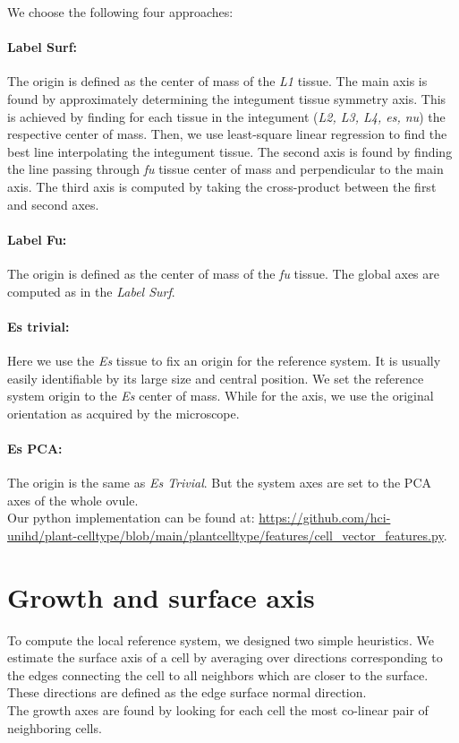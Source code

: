 \documentclass[10pt,twocolumn,letterpaper]{article}
\begin{document}
We choose the following four approaches: 

\paragraph{Label Surf:} The origin is defined as the center of mass of the \textit{L1} tissue. 
The main axis is found by approximately determining the integument tissue symmetry axis. This is achieved by finding for each tissue in the integument (\textit{L2, L3, L4, es, nu}) the respective center of mass. Then, we use least-square linear regression to find the best line interpolating the integument tissue. The second axis is found by finding the line passing through \textit{fu} tissue center of mass and perpendicular to the main axis. The third axis is computed by taking the cross-product between the first and second axes.

\paragraph{Label Fu:} The origin is defined as the center of mass of the \textit{fu} tissue. The global axes are computed as in the \textit{Label Surf}.

\paragraph{Es trivial:} Here we use the \textit{Es} tissue to fix an origin for the reference system. It is usually easily identifiable by its large size and central position. We set the reference system origin to the  \textit{Es} center of mass. While for the axis, we use the original orientation as acquired by the microscope. 

\paragraph{Es PCA:} The origin is the same as \textit{Es Trivial}. But the system axes are set to the PCA axes of the whole ovule.\\

Our python implementation can be found at: \url{https://github.com/hci-unihd/plant-celltype/blob/main/plantcelltype/features/cell_vector_features.py}.\\


\section{Growth and surface axis}
\label{suppl:sec2}
To compute the local reference system, we designed two simple heuristics. 
We estimate the surface axis of a cell by averaging over directions corresponding to the edges connecting the cell to all neighbors which are closer to the surface. These directions are defined as the edge surface normal direction.\\ 
The growth axes are found by looking for each cell the most co-linear pair of neighboring cells.
\end{document}
